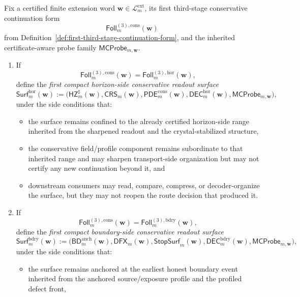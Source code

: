 \begin{definition}
\label{def:first-compact-conservative-readout-surface}
Fix a certified finite extension word \(\mathbf w\in\mathcal L^{\mathrm{ext}}_{m}\), its first third-stage conservative continuation form
\[
  \mathsf{Foll}^{(3),\mathrm{cons}}_{m}(\mathbf w)
\]
from Definition~\ref{def:first-third-stage-continuation-form}, and the inherited certificate-aware probe family \(\mathsf{MCProbe}_{m,\mathbf w}\).
\begin{enumerate}[label=(\roman*)]
  \item If
  \[
    \mathsf{Foll}^{(3),\mathrm{cons}}_{m}(\mathbf w)=\mathsf{Foll}^{(3),\mathrm{hor}}_{m}(\mathbf w),
  \]
  define the \emph{first compact horizon-side conservative readout surface}
  \[
    \mathsf{Surf}^{\mathrm{hor}}_{m}(\mathbf w)
    :=
    \bigl(\mathsf{HZ}^{\sharp}_{m}(\mathbf w),\mathsf{CRS}_{m}(\mathbf w),\mathsf{PDE}^{\mathrm{cons}}_{m}(\mathbf w),\mathsf{DEC}^{\mathrm{hor}}_{m}(\mathbf w),\mathsf{MCProbe}_{m,\mathbf w}\bigr),
  \]
  under the side conditions that:
  \begin{itemize}[leftmargin=2em]
    \item the surface remains confined to the already certified horizon-side range inherited from the sharpened readout and the crystal-stabilized structure,
    \item the conservative field/profile component remains subordinate to that inherited range and may sharpen transport-side organization but may not certify any new continuation beyond it, and
    \item downstream consumers may read, compare, compress, or decoder-organize the surface, but they may not reopen the route decision that produced it.
  \end{itemize}
  \item If
  \[
    \mathsf{Foll}^{(3),\mathrm{cons}}_{m}(\mathbf w)=\mathsf{Foll}^{(3),\mathrm{bdry}}_{m}(\mathbf w),
  \]
  define the \emph{first compact boundary-side conservative readout surface}
  \[
    \mathsf{Surf}^{\mathrm{bdry}}_{m}(\mathbf w)
    :=
    \bigl(\mathsf{BD}^{\mathrm{anch}}_{m}(\mathbf w),\mathsf{DFX}_{m}(\mathbf w),\mathsf{StopSurf}_{m}(\mathbf w),\mathsf{DEC}^{\mathrm{bdry}}_{m}(\mathbf w),\mathsf{MCProbe}_{m,\mathbf w}\bigr),
  \]
  under the side conditions that:
  \begin{itemize}[leftmargin=2em]
    \item the surface remains anchored at the earliest honest boundary event inherited from the anchored source/exposure profile and the profiled defect front,

\end{itemize}
\end{enumerate}
\end{definition}
